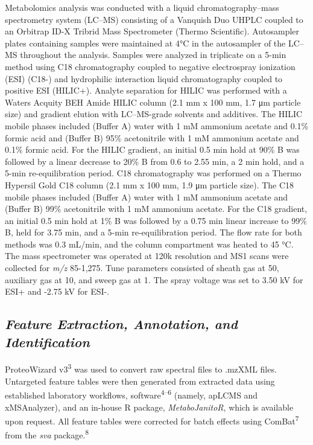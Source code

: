 \documentclass[
]{article}
\begin{document}
\noindent\hspace{1.5em}Metabolomics analysis was conducted with a liquid
chromatography--mass spectrometry system (LC--MS) consisting of a
Vanquish Duo UHPLC coupled to an Orbitrap ID-X Tribrid Mass Spectrometer
(Thermo Scientific). Autosampler plates containing samples were
maintained at 4°C in the autosampler of the LC--MS throughout the
analysis. Samples were analyzed in triplicate on a 5-min method using
C18 chromatography coupled to negative electrospray ionization (ESI)
(C18-) and hydrophilic interaction liquid chromatography coupled to
positive ESI (HILIC+). Analyte separation for HILIC was performed with a
Waters Acquity BEH Amide HILIC column (2.1 mm x 100 mm, 1.7 μm particle
size) and gradient elution with LC--MS-grade solvents and additives. The
HILIC mobile phases included (Buffer A) water with 1 mM ammonium acetate
and 0.1\% formic acid and (Buffer B) 95\% acetonitrile with 1 mM
ammonium acetate and 0.1\% formic acid. For the HILIC gradient, an
initial 0.5 min hold at 90\% B was followed by a linear decrease to 20\%
B from 0.6 to 2.55 min, a 2 min hold, and a 5-min re-equilibration
period. C18 chromatography was performed on a Thermo Hypersil Gold C18
column (2.1 mm x 100 mm, 1.9 μm particle size). The C18 mobile phases
included (Buffer A) water with 1 mM ammonium acetate and (Buffer B) 99\%
acetonitrile with 1 mM ammonium acetate. For the C18 gradient, an
initial 0.5 min hold at 1\% B was followed by a 0.75 min linear increase
to 99\% B, held for 3.75 min, and a 5-min re-equilibration period. The
flow rate for both methods was 0.3 mL/min, and the column compartment
was heated to 45 °C. The mass spectrometer was operated at 120k
resolution and MS1 scans were collected for \textit{m/z} 85-1,275. Tune
parameters consisted of sheath gas at 50, auxiliary gas at 10, and sweep
gas at 1. The spray voltage was set to 3.50 kV for ESI+ and -2.75 kV for
ESI-.

\subsection{\texorpdfstring{\emph{Feature Extraction, Annotation, and
Identification}}{Feature Extraction, Annotation, and Identification}}\label{feature-extraction-annotation-and-identification}

ProteoWizard v3\textsuperscript{3} was used to convert raw spectral
files to .mzXML files. Untargeted feature tables were then generated
from extracted data using established laboratory workflows,
software\textsuperscript{4--6} (namely, apLCMS and xMSAnalyzer), and an
in-house R package, \textit{MetaboJanitoR}, which is available upon
request. All feature tables were corrected for batch effects using
ComBat\textsuperscript{7} from the \textit{sva}
package.\textsuperscript{8}
\end{document}
